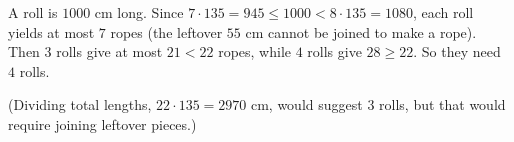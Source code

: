 A roll is $1000$ cm long. Since $7\cdot135=945\le1000<8\cdot135=1080$, each roll yields at most $7$ ropes (the leftover $55$ cm cannot be joined to make a rope). Then $3$ rolls give at most $21<22$ ropes, while $4$ rolls give $28\ge22$. So they need $\boxed{4}$ rolls.

(Dividing total lengths, $22\cdot135=2970$ cm, would suggest $3$ rolls, but that would require joining leftover pieces.)
